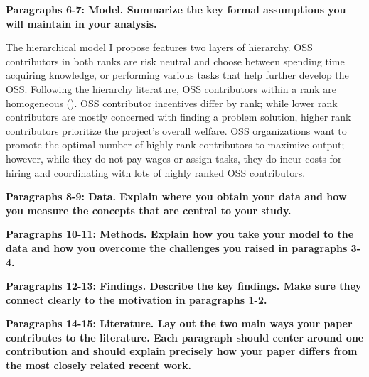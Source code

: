 \documentclass[source/paper/main.tex]{subfiles}
\begin{document}
\textbf{Paragraphs 6-7: Model. Summarize the key formal assumptions you will maintain in your analysis.}

\qquad The hierarchical model I propose features two layers of hierarchy. OSS contributors in both ranks are risk neutral and choose between spending time acquiring knowledge, or performing various tasks that help further develop the OSS. Following the hierarchy literature, OSS contributors within a rank are homogeneous (\cite{garicano_hierarchies_2000}). OSS contributor incentives differ by rank; while lower rank contributors are mostly concerned with finding a problem solution, higher rank contributors prioritize the project's overall welfare. OSS organizations want to promote the optimal number of highly rank contributors to maximize output; however, while they do not pay wages or assign tasks, they do incur costs for hiring and coordinating with lots of highly ranked OSS contributors. 

\textbf{Paragraphs 8-9: Data. Explain where you obtain your data and how you measure the concepts that are central to your study.}

\textbf{Paragraphs 10-11: Methods. Explain how you take your model to the data and how you overcome the challenges you raised in paragraphs 3-4.}

\textbf{Paragraphs 12-13: Findings. Describe the key findings. Make sure they connect clearly to the motivation in paragraphs 1-2.}

\textbf{Paragraphs 14-15: Literature. Lay out the two main ways your paper contributes to the literature. Each paragraph should center around one contribution and should explain precisely how your paper differs from the most closely related recent work.}
\end{document}
